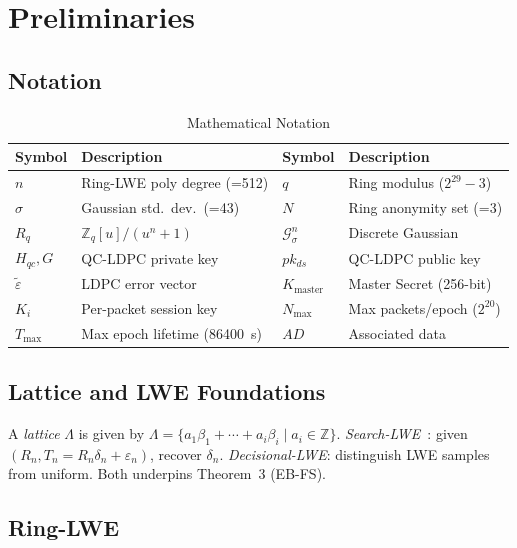 \documentclass[conference]{IEEEtran}
\newcommand{\Kmaster}{K_{\mathrm{master}}}
\newcommand{\Nmax}{N_{\max}}
\newcommand{\Tmax}{T_{\max}}
\begin{document}
\section{Preliminaries}
\label{sec:prelim}

\subsection{Notation}

\begin{table}[!t]
\centering
\caption{Mathematical Notation}
\label{tab:notation}
\begin{tabular}{ll|ll}
\toprule
\textbf{Symbol} & \textbf{Description} & \textbf{Symbol} & \textbf{Description} \\
\midrule
$n$ & Ring-LWE poly degree (=512) & $q$ & Ring modulus ($2^{29}-3$) \\
$\sigma$ & Gaussian std.\ dev.\ (=43) & $N$ & Ring anonymity set (=3) \\
$R_q$ & $\mathbb{Z}_q[u]/(u^n+1)$ & $\mathcal{G}^n_\sigma$ & Discrete Gaussian \\
$H_{qc}, G$ & QC-LDPC private key & $pk_{ds}$ & QC-LDPC public key \\
$\tilde{\varepsilon}$ & LDPC error vector & $\Kmaster$ & Master Secret (256-bit) \\
$K_i$ & Per-packet session key & $\Nmax$ & Max packets/epoch ($2^{20}$) \\
$\Tmax$ & Max epoch lifetime (86400~s) & $AD$ & Associated data \\
\bottomrule
\end{tabular}
\end{table}

\subsection{Lattice and LWE Foundations}

A \emph{lattice} $\Lambda$ is given by $\Lambda = \{ a_1\beta_1 + \cdots + a_i\beta_i \mid a_i \in \mathbb{Z} \}$.
\emph{Search-LWE}~\cite{regev2009}: given $(R_n, T_n = R_n\delta_n + \varepsilon_n)$, recover $\delta_n$.
\emph{Decisional-LWE}: distinguish LWE samples from uniform. Both underpins Theorem~3 (EB-FS).

\subsection{Ring-LWE}
\end{document}
